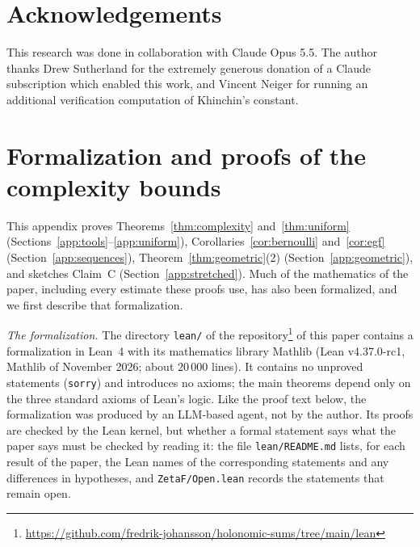 \documentclass[11pt,reqno]{amsart}
\theoremstyle{definition}
\theoremstyle{remark}
\begin{document}
\section*{Acknowledgements}

This research was done in collaboration with Claude Opus 5.5.
The author thanks Drew Sutherland for the extremely generous donation of a
Claude subscription which enabled this work, and Vincent Neiger for running an additional
verification computation of Khinchin's constant.

\appendix

\section{Formalization and proofs of the complexity bounds}\label{app:cost}

This appendix proves Theorems~\ref{thm:complexity} and~\ref{thm:uniform} (Sections~\ref{app:tools}--\ref{app:uniform}),
Corollaries~\ref{cor:bernoulli} and~\ref{cor:egf} (Section~\ref{app:sequences}), Theorem~\ref{thm:geometric}(2)
(Section~\ref{app:geometric}), and sketches Claim~C (Section~\ref{app:stretched}). Much of the mathematics of the paper,
including every estimate these proofs use, has also been formalized, and we first describe that formalization.

\emph{The formalization.} The directory \texttt{lean/} of the repository\footnote{\url{https://github.com/fredrik-johansson/holonomic-sums/tree/main/lean}}
of this paper contains a formalization in
Lean~4 with its mathematics library Mathlib (Lean v4.37.0-rc1, Mathlib of November 2026; about $20\,000$ lines). It
contains no unproved statements (\texttt{sorry}) and introduces no axioms; the main theorems depend only on the three
standard axioms of Lean's logic. Like the proof text below, the formalization was produced by an LLM-based agent, not
by the author. Its proofs are checked by the Lean kernel, but whether a formal statement says what the paper says must
be checked by reading it: the file \texttt{lean/README.md} lists, for each result of the paper, the Lean names of the
corresponding statements and any differences in hypotheses, and \texttt{ZetaF/Open.lean} records the statements that
remain open.
\end{document}
